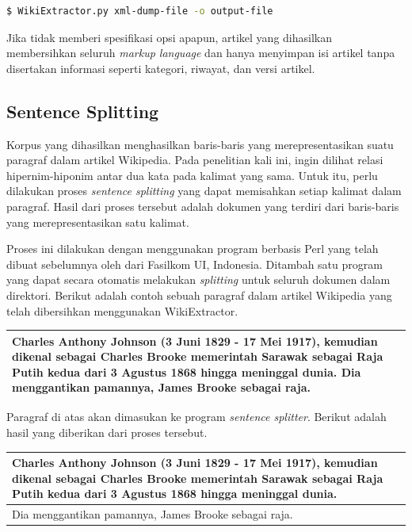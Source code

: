 \begin{lstlisting}[caption={Penggunaan Wiki Extractor}, language=bash]
$ WikiExtractor.py xml-dump-file -o output-file
\end{lstlisting}

\noindent Jika tidak memberi spesifikasi opsi apapun, artikel yang dihasilkan membersihkan seluruh \textit{markup language} dan hanya menyimpan isi artikel tanpa disertakan informasi seperti kategori, riwayat, dan versi artikel.

\subsection{Sentence Splitting}
Korpus yang dihasilkan menghasilkan baris-baris yang merepresentasikan suatu paragraf dalam artikel Wikipedia. Pada penelitian kali ini, ingin dilihat relasi hipernim-hiponim antar dua kata pada kalimat yang sama. Untuk itu, perlu dilakukan proses \textit{sentence splitting} yang dapat memisahkan setiap kalimat dalam paragraf. Hasil dari proses tersebut adalah dokumen yang terdiri dari baris-baris yang merepresentasikan satu kalimat. 

Proses ini dilakukan dengan menggunakan program berbasis Perl yang telah dibuat sebelumnya oleh \cite{ken2016pengembangan} dari Fasilkom UI, Indonesia. Ditambah satu program yang dapat secara otomatis melakukan \textit{splitting} untuk seluruh dokumen dalam direktori. Berikut adalah contoh sebuah paragraf dalam artikel Wikipedia yang telah dibersihkan menggunakan WikiExtractor.

\begin{center}
\begin{tabular}{ | m{32em} | } 
\hline
Charles Anthony Johnson (3 Juni 1829 - 17 Mei 1917), kemudian dikenal sebagai Charles Brooke memerintah Sarawak sebagai Raja Putih kedua dari 3 Agustus 1868 hingga meninggal dunia. Dia menggantikan pamannya, James Brooke sebagai raja. \\ \hline 
\end{tabular}
\end{center}

\noindent Paragraf   di atas akan dimasukan ke program \textit{sentence splitter}. Berikut adalah hasil yang diberikan dari proses tersebut.

\begin{center}
\begin{tabular}{ | m{32em} | } 
\hline
Charles Anthony Johnson (3 Juni 1829 - 17 Mei 1917), kemudian dikenal sebagai Charles Brooke memerintah Sarawak sebagai Raja Putih kedua dari 3 Agustus 1868 hingga meninggal dunia. \\ \hline 
Dia menggantikan pamannya, James Brooke sebagai raja. \\
\hline
\end{tabular}
\end{center}

